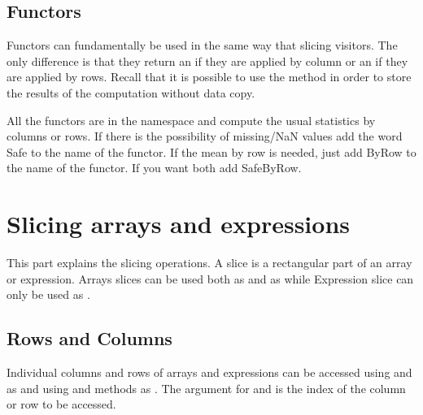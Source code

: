 \documentclass[a4paper,10pt]{article}
\begin{document}
\subsection{Functors}

Functors can fundamentally be used in the same way that slicing visitors. The
only difference is that they return an  if they are applied
by column or an  if they are applied by rows. Recall that it
is possible to use the  method in order to store the results of the
computation without data copy.

All the functors are in the  namespace and compute the usual statistics
by columns or rows. If there is the possibility of missing/NaN values add the word
Safe to the name of the functor. If the mean by row is needed, just add ByRow
to the name of the functor. If you want both add SafeByRow.

\begin{minipage}[t]{0.5\textwidth}

\end{minipage}
\hspace{0.2cm}
\begin{minipage}[t]{0.5\textwidth}
\addtocounter{lstlisting}{-1}

\end{minipage}




\section{Slicing arrays and expressions}

This part explains the slicing operations. A slice is a rectangular part of an
array or expression. Arrays slices can be used both as  and as 
while Expression slice can only be used as .

\subsection{Rows and Columns}

Individual columns and rows of arrays and expressions can be accessed using
 and  as 
and using  and  methods as
. The argument for  and  is the index
of the column or row to be accessed.
\end{document}
